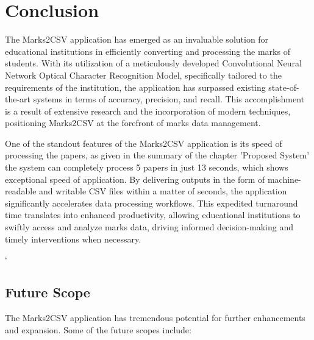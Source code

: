 \chapter{Conclusion}

\noindent The Marks2CSV application has emerged as an invaluable solution for educational institutions in efficiently converting and processing the marks of students. With its utilization of a meticulously developed Convolutional Neural Network Optical Character Recognition Model, specifically tailored to the requirements of the institution, the application has surpassed existing state-of-the-art systems in terms of accuracy, precision, and recall. This accomplishment is a result of extensive research and the incorporation of modern techniques, positioning Marks2CSV at the forefront of marks data management.

\noindent One of the standout features of the Marks2CSV application is its speed of processing the papers, as given in the summary of the chapter 'Proposed System' the system can completely process 5 papers in just 13 seconds, which shows exceptional speed of application. By delivering outputs in the form of machine-readable and writable CSV files within a matter of seconds, the application significantly accelerates data processing workflows. This expedited turnaround time translates into enhanced productivity, allowing educational institutions to swiftly access and analyze marks data, driving informed decision-making and timely interventions when necessary.

\clearpage`
\section{Future Scope}

The Marks2CSV application has tremendous potential for further enhancements and expansion. Some of the future scopes include:

